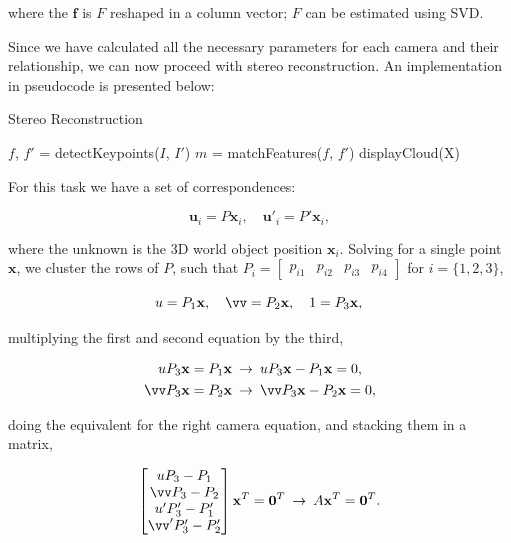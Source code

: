 \documentclass[12pt]{article}
\begin{document}
where the $\mathbf{f}$ is $F$ reshaped in a column vector; $F$ can be estimated using SVD.

Since we have calculated all the necessary parameters for each camera and their relationship, we can now proceed with stereo reconstruction.
An implementation in pseudocode is presented below:

\begin{algorithm}[H]
 \caption{Stereo Reconstruction}
 $f$, $f'$ = detectKeypoints($I$, $I'$)\;
 $m$ = matchFeatures($f$, $f'$)\;
 displayCloud(X)\;
\end{algorithm}

For this task we have a set of correspondences:

\begin{equation}
 \mathbf{u}_{i} = P\mathbf{x}_i, \quad \mathbf{u'}_{i} = P'\mathbf{x}_i,
\end{equation}

where the unknown is the 3D world object position $\mathbf{x}_i$.
Solving for a single point $\mathbf{x}$, we cluster the rows of $P$, such that $P_i = \begin{bmatrix} p_{i1} & p_{i2} & p_{i3} & p_{i4}  \end{bmatrix}$ for $i = \lbrace 1, 2, 3 \rbrace$,

\begin{equation}
 u = P_1\mathbf{x}, \quad \vv = P_2\mathbf{x}, \quad 1 = P_3\mathbf{x},\\
\end{equation}

multiplying the first and second equation by the third,

\begin{equation}
\begin{aligned}
	uP_3\mathbf{x} &=  P_1\mathbf{x} \: \rightarrow  \: uP_3\mathbf{x} - P_1\mathbf{x} = 0,\\
	\vv P_3\mathbf{x} &= P_2\mathbf{x} \: \rightarrow \: \vv P_3\mathbf{x} - P_2\mathbf{x} = 0,
\end{aligned}
\end{equation}

doing the equivalent for the right camera equation, and stacking them in a matrix,

\begin{equation}
	\begin{bmatrix}
	uP_3 - P_1 \\
	\vv P_3 - P_2 \\
	u'P_3' - P_1' \\
	\vv' P_3' - P_2'	
	\end{bmatrix}
	\mathbf{x}^T
	= \mathbf{0}^T \: \rightarrow  \: A\mathbf{x}^T = \mathbf{0}^T.
\end{equation}
\end{document}
